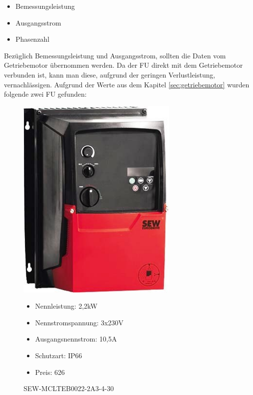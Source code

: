 \begin{itemize}
	\item{Bemessungsleistung}
	\item{Ausgangsstrom}
	\item{Phasenzahl}
\end{itemize}

Bezüglich Bemessungsleistung und Ausgangsstrom, sollten die Daten vom Getriebemotor übernommen werden. Da der \ac{FU} direkt mit dem Getriebemotor verbunden ist, kann man diese, aufgrund der geringen Verlustleistung, vernachlässigen. Aufgrund der Werte aus dem Kapitel \ref{sec:getriebemotor} wurden folgende zwei \ac{FU} gefunden:
\newpage

\begin{figure}[H]
\begin{minipage}[t]{0.45\textwidth}
\includegraphics[width=0.70\textwidth]{fig/SEWFU}
\caption{SEW-MCLTEB0022-2A3-4-30}

\begin{itemize}
	\item{Nennleistung: 2,2kW}
	\item{Nennstromspannung: 3x230V}
	\item{Ausgangsnennstrom: 10,5A}
	\item{Schutzart: IP66}
	\item{Preis: 626\textsf{\texteuro}}
\end{itemize}


\end{minipage}
\end{figure}
